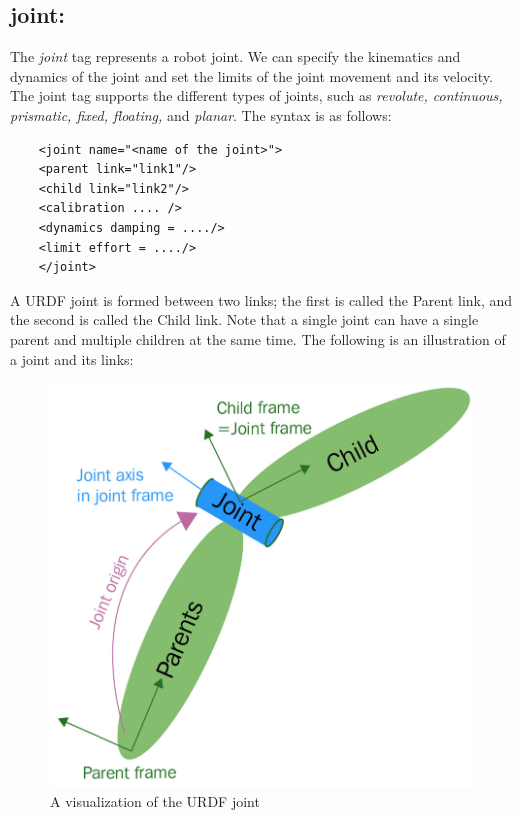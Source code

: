 \documentclass[../../main]{subfiles}
\begin{document}
\subsection{joint:}
The \emph{joint} tag represents a robot joint. We can specify the kinematics and
dynamics of the joint and set the limits of the joint movement and its velocity. The
joint tag supports the different types of joints, such as \emph{revolute, continuous,
prismatic, fixed, floating,} and \emph{planar}.
The syntax is as follows:
\\

\begin{verbatim}
    <joint name="<name of the joint>">
    <parent link="link1"/>
    <child link="link2"/>
    <calibration .... />
    <dynamics damping = ..../>
    <limit effort = ..../>
    </joint>
\end{verbatim}
A URDF joint is formed between two links; the first is called the Parent link, and the
second is called the Child link. Note that a single joint can have a single parent and
multiple children at the same time. The following is an illustration of a joint and its links:
\begin{figure}[ht]
    \centering
    \includegraphics{sublatex/hashem/img/joint1.jpg}
    \caption{A visualization of the URDF joint\cite{joseph2018mastering}}
\end{figure}
\end{document}
